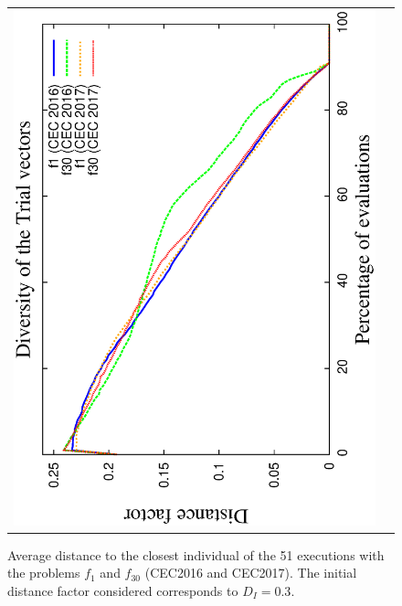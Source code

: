 \begin{figure}[t]
\begin{tabular}{cc}
   \includegraphics[scale=0.23, angle=-90]{img/Diversity_Trial.eps} 
\end{tabular}
\caption{ Average distance to the closest individual of the 51 executions with the problems $f_1$ and $f_{30}$ (CEC2016 and CEC2017). The initial distance factor considered corresponds to $D_I=0.3$.}
\label{fig:diversity}
\end{figure}



%
%

